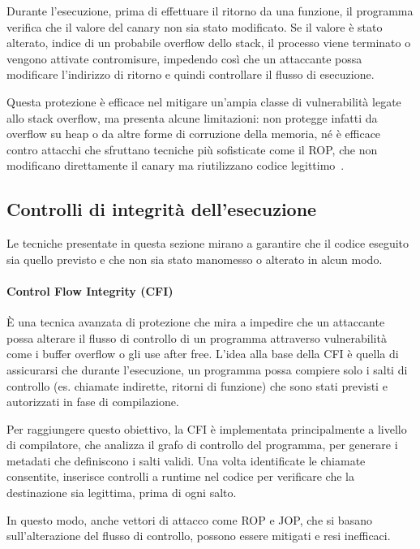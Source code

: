 Durante l'esecuzione, prima di effettuare il ritorno da una funzione, il
programma verifica che il valore del canary non sia stato modificato. Se il valore
è stato alterato, indice di un probabile overflow dello stack, il processo viene
terminato o vengono attivate contromisure, impedendo così che un attaccante
possa modificare l'indirizzo di ritorno e quindi controllare il flusso di
esecuzione.

Questa protezione è efficace nel mitigare un'ampia classe di vulnerabilità
legate allo stack overflow, ma presenta alcune limitazioni: non protegge infatti
da overflow su heap o da altre forme di corruzione della memoria, né è efficace contro
attacchi che sfruttano tecniche più sofisticate come il ROP, che non modificano
direttamente il canary ma riutilizzano codice legittimo~\cite{stack_canaries}.

\subsection{Controlli di integrità dell'esecuzione}
\label{sec:execution-integrity} Le tecniche presentate in questa sezione mirano a
garantire che il codice eseguito sia quello previsto e che non sia stato manomesso
o alterato in alcun modo.

\paragraph{Control Flow Integrity (CFI)}
È una tecnica avanzata di protezione che mira a impedire che un attaccante possa
alterare il flusso di controllo di un programma attraverso vulnerabilità come i
buffer overflow o gli use after free. L'idea alla base della CFI è quella di assicurarsi
che durante l'esecuzione, un programma possa compiere solo i salti di controllo
(es. chiamate indirette, ritorni di funzione) che sono stati previsti e
autorizzati in fase di compilazione.

Per raggiungere questo obiettivo, la CFI è implementata principalmente a livello
di compilatore, che analizza il grafo di controllo del programma, per generare i
metadati che definiscono i salti validi. Una volta identificate le chiamate
consentite, inserisce controlli a runtime nel codice per verificare che la destinazione
sia legittima, prima di ogni salto.

In questo modo, anche vettori di attacco come ROP e JOP, che si basano sull'alterazione
del flusso di controllo, possono essere mitigati e resi inefficaci.


